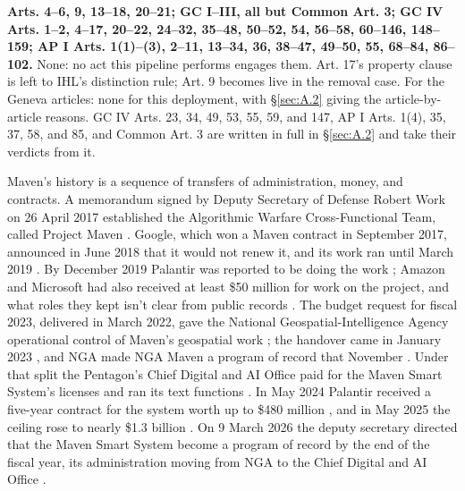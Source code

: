 \textbf{Arts. 4–6, 9, 13–18, 20–21; GC I–III, all but Common Art. 3; GC IV Arts. 1–2, 4–17, 20–22, 24–32, 35–48, 50–52, 54, 56–58, 60–146, 148–159; AP I Arts. 1(1)–(3), 2–11, 13–34, 36, 38–47, 49–50, 55, 68–84, 86–102.} None: no act this pipeline performs engages them. Art. 17's property clause is left to IHL's distinction rule; Art. 9 becomes live in the removal case. For the Geneva articles: none for this deployment, with \S\ref{sec:A.2} giving the article-by-article reasons. GC IV Arts. 23, 34, 49, 53, 55, 59, and 147, AP I Arts. 1(4), 35, 37, 58, and 85, and Common Art. 3 are written in full in \S\ref{sec:A.2} and take their verdicts from it.


Maven's history is a sequence of transfers of administration, money, and contracts. A memorandum signed by Deputy Secretary of Defense Robert Work on 26 April 2017 established the Algorithmic Warfare Cross-Functional Team, called Project Maven \autocite{work2017maven,allen2017maven}. Google, which won a Maven contract in September 2017, announced in June 2018 that it would not renew it, and its work ran until March 2019 \autocite{fang2018maven,conger2018maven}. By December 2019 Palantir was reported to be doing the work \autocite{peterson2019palantir}; Amazon and Microsoft had also received at least \$50 million for work on the project, and what roles they kept isn't clear from public records \autocite{poulson2023maven}. The budget request for fiscal 2023, delivered in March 2022, gave the National Geospatial-Intelligence Agency operational control of Maven's geospatial work \autocite{breakingdefense2022nga}; the handover came in January 2023 \autocite{albon2023nga}, and NGA made NGA Maven a program of record that November \autocite{nga2023programrecord}. Under that split the Pentagon's Chief Digital and AI Office paid for the Maven Smart System's licenses and ran its text functions \autocite{csis2026maven}. In May 2024 Palantir received a five-year contract for the system worth up to \$480 million \autocite{register2024maven,defensescoop2025maven}, and in May 2025 the ceiling rose to nearly \$1.3 billion \autocite{defensescoop2025maven}. On 9 March 2026 the deputy secretary directed that the Maven Smart System become a program of record by the end of the fiscal year, its administration moving from NGA to the Chief Digital and AI Office \autocite{defensescoop2026maven}.

